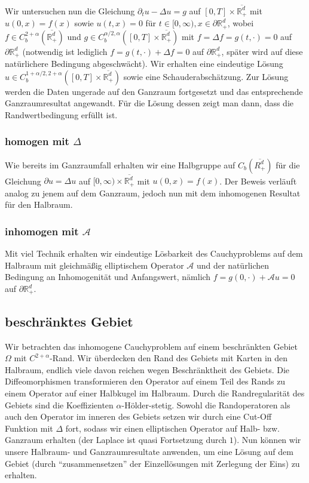 \documentclass[11pt,a4paper]{scrartcl}
\newcommand{\R}{\mathbb{R}} %
\newcommand{\A}{\mathcal{A}}
\theoremstyle{plain}
\theoremstyle{definition}
\theoremstyle{remark}
\begin{document}
Wir untersuchen nun die Gleichung $\partial_t u - \Delta u = g$ auf $[0,T] \times \overline{\R^d_+}$ mit $u(0,x)=f(x)$ sowie $u(t,x)=0$ für $t\in [0,\infty), x\in \partial \R^d_+$, wobei $f\in C_b^{2+\alpha}(\overline{\R^d_+})$ und $g\in C_b^{\alpha/2, \alpha}([0,T] \times \overline{\R^d_+})$ mit $f=\Delta f = g(t,\cdot)=0$ auf $\partial \R^d_+$ (notwendig ist lediglich $f=g(t,\cdot)+\Delta f=0$ auf $\partial \R^d_+$, später wird auf diese natürlichere Bedingung abgeschwächt). Wir erhalten eine eindeutige Lösung $u\in C_b^{1+\alpha/2, 2+\alpha}([0,T]\times \overline{\R^d_+})$ sowie eine Schauderabschätzung. Zur Lösung werden die Daten ungerade auf den Ganzraum fortgesetzt und das entsprechende Ganzraumresultat angewandt. Für die Lösung dessen zeigt man dann, dass die Randwertbedingung erfüllt ist. 

\subsubsection{homogen mit $\Delta$}

Wie bereits im Ganzraumfall erhalten wir eine Halbgruppe auf $C_b(\overline{R^d_+})$ für die Gleichung $\partial u = \Delta u$ auf $[0,\infty) \times \overline{\R^d_+}$ mit $u(0,x)=f(x)$. Der Beweis verläuft analog zu jenem auf dem Ganzraum, jedoch nun mit dem inhomogenen Resultat für den Halbraum.

\subsubsection{inhomogen mit $\A$}

Mit viel Technik erhalten wir eindeutige Lösbarkeit des Cauchyproblems auf dem Halbraum mit gleichmäßig elliptischem Operator $\A$ und der natürlichen Bedingung an Inhomogenität und Anfangswert, nämlich $f=g(0,\cdot) + \A u=0$ auf $\partial \R^d_+$.

\subsection{beschränktes Gebiet}

Wir betrachten das inhomogene Cauchyproblem auf einem beschränkten Gebiet $\Omega$ mit $C^{2+\alpha}$-Rand. Wir überdecken den Rand des Gebiets mit Karten in den Halbraum, endlich viele davon reichen wegen Beschränktheit des Gebiets. Die Diffeomorphismen transformieren den Operator auf einem Teil des Rands zu einem Operator auf einer Halbkugel im Halbraum. Durch die Randregularität des Gebiets sind die Koeffizienten $\alpha$-Hölder-stetig. Sowohl die Randoperatoren als auch den Operator im inneren des Gebiets setzen wir durch eine Cut-Off Funktion mit $\Delta$ fort, sodass wir einen elliptischen Operator auf Halb- bzw. Ganzraum erhalten (der Laplace ist quasi Fortsetzung durch $1$). Nun können wir unsere Halbraum- und Ganzraumresultate anwenden, um eine Lösung auf dem Gebiet (durch \enquote{zusammensetzen} der Einzellösungen mit Zerlegung der Eins) zu erhalten.
\end{document}
